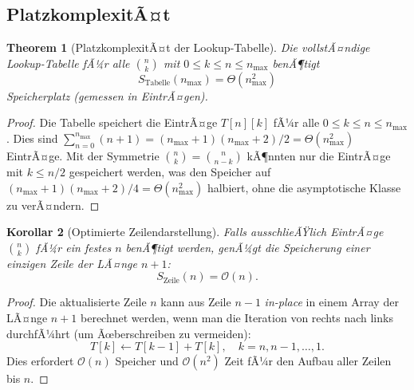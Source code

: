 ﻿\documentclass[12pt, a4paper]{article}
\newcommand{\Oh}{\mathcal{O}}
\theoremstyle{plain}
\newtheorem{theorem}{Theorem}[section]
\newtheorem{korollar}[theorem]{Korollar}
\theoremstyle{definition}
\theoremstyle{remark}
\renewcommand{\Oh}{\mathcal{O}}
\begin{document}
\subsection{PlatzkomplexitÃ¤t}

\begin{theorem}[PlatzkomplexitÃ¤t der Lookup-Tabelle]
  \label{thm:platz}
  Die vollstÃ¤ndige Lookup-Tabelle fÃ¼r alle $\binom{n}{k}$ mit
  $0 \le k \le n \le n_{\max}$ benÃ¶tigt
  \begin{equation}
    S_{\text{Tabelle}}(n_{\max}) = \Theta(n_{\max}^2)
    \label{eq:platz_tabelle}
  \end{equation}
  Speicherplatz (gemessen in EintrÃ¤gen).
\end{theorem}

\begin{proof}
  Die Tabelle speichert die EintrÃ¤ge $T[n][k]$ fÃ¼r alle
  $0 \le k \le n \le n_{\max}$. Dies sind
  $\sum_{n=0}^{n_{\max}}(n+1) = (n_{\max}+1)(n_{\max}+2)/2 = \Theta(n_{\max}^2)$
  EintrÃ¤ge. Mit der Symmetrie $\binom{n}{k} = \binom{n}{n-k}$
  kÃ¶nnten nur die EintrÃ¤ge mit $k \le n/2$ gespeichert werden,
  was den Speicher auf $(n_{\max}+1)(n_{\max}+2)/4 = \Theta(n_{\max}^2)$
  halbiert, ohne die asymptotische Klasse zu verÃ¤ndern.
\end{proof}

\begin{korollar}[Optimierte Zeilendarstellung]
  \label{kor:zeile_platz}
  Falls ausschlieÃŸlich EintrÃ¤ge $\binom{n}{k}$ fÃ¼r ein festes $n$ benÃ¶tigt
  werden, genÃ¼gt die Speicherung einer einzigen Zeile der LÃ¤nge $n+1$:
  \begin{equation}
    S_{\text{Zeile}}(n) = \Oh(n).
  \end{equation}
\end{korollar}

\begin{proof}
  Die aktualisierte Zeile $n$ kann aus Zeile $n-1$ \emph{in-place}
  in einem Array der LÃ¤nge $n+1$ berechnet werden, wenn man die
  Iteration von rechts nach links durchfÃ¼hrt (um Ãœberschreiben zu vermeiden):
  \begin{equation}
    T[k] \leftarrow T[k-1] + T[k], \quad k = n, n-1, \ldots, 1.
  \end{equation}
  Dies erfordert $\Oh(n)$ Speicher und $\Oh(n^2)$ Zeit fÃ¼r den
  Aufbau aller Zeilen bis $n$.
\end{proof}
\end{document}
